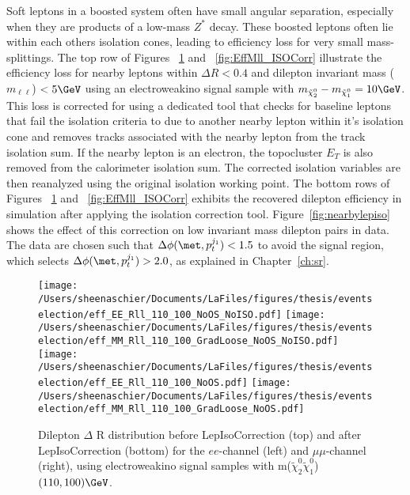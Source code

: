  Soft leptons in a boosted system often have small angular separation, especially when they are products of a low-mass $Z^*$ decay.  These boosted leptons often lie within each others isolation cones, leading to efficiency loss for very small mass-splittings.  The top row of Figures~ \ref{fig:EffRll_ISOCorr} and ~\ref{fig:EffMll_ISOCorr} illustrate the efficiency loss for nearby leptons within $\Delta R < 0.4$ and dilepton invariant mass ($m_{\ell\ell}$) $<5\GeV$ using an electroweakino signal sample with $m_{\tilde\chi_2^0}-m_{\tilde\chi_1^0}=10\GeV$.  This loss is corrected for using a dedicated tool that checks for baseline leptons that fail the isolation criteria to due to another nearby lepton within it's isolation cone and removes tracks associated with the nearby lepton from the track isolation sum.  If the nearby lepton is an electron, the topocluster $E_T$ is also removed from the calorimeter isolation sum.  The corrected isolation variables are then reanalyzed using the original isolation working point.  The bottom rows of Figures~ \ref{fig:EffRll_ISOCorr} and ~\ref{fig:EffMll_ISOCorr} exhibits the recovered dilepton efficiency in simulation after applying the isolation correction tool.  Figure~\ref{fig:nearbylepiso} shows the effect of this correction on low invariant mass dilepton pairs in data.  The data are chosen such that $\Delta\phi(\met, p_{t}^{j_1})<1.5$ to avoid the signal region, which selects $\Delta\phi(\met, p_{t}^{j_1})>2.0$, as explained in Chapter~\ref{ch:sr}.   
  \begin{figure}[tbp]
     \texttt{[image: /Users/sheenaschier/Documents/LaFiles/figures/thesis/eventselection/eff\_EE\_Rll\_110\_100\_NoOS\_NoISO.pdf]}
       \texttt{[image: /Users/sheenaschier/Documents/LaFiles/figures/thesis/eventselection/eff\_MM\_Rll\_110\_100\_GradLoose\_NoOS\_NoISO.pdf]}\\
     \texttt{[image: /Users/sheenaschier/Documents/LaFiles/figures/thesis/eventselection/eff\_EE\_Rll\_110\_100\_NoOS.pdf]}
     \texttt{[image: /Users/sheenaschier/Documents/LaFiles/figures/thesis/eventselection/eff\_MM\_Rll\_110\_100\_GradLoose\_NoOS.pdf]}\\
   \caption{Dilepton $\Delta$ R distribution before LepIsoCorrection (top) and after LepIsoCorrection (bottom) for the $ee$-channel (left) and $\mu\mu$-channel (right), using electroweakino signal samples with m($\tilde\chi_2^0\tilde\chi_1^0$) $(110, 100)\GeV$.}
   \label{fig:EffRll_ISOCorr}
 \end{figure}

